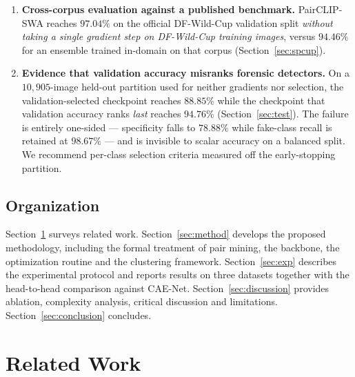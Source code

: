 \documentclass[10pt,journal]{IEEEtran}
\begin{document}
\begin{enumerate}
\item \textbf{Cross-corpus evaluation against a published benchmark.}
PairCLIP-SWA reaches $97.04\%$ on the official DF-Wild-Cup validation split
\emph{without taking a single gradient step on DF-Wild-Cup training images},
versus $94.46\%$ for an ensemble trained in-domain on that corpus
(Section~\ref{sec:spcup}).

\item \textbf{Evidence that validation accuracy misranks forensic
detectors.} On a $10{,}905$-image held-out partition used for neither
gradients nor selection, the validation-selected checkpoint reaches $88.85\%$
while the checkpoint that validation accuracy ranks \emph{last} reaches
$94.76\%$ (Section~\ref{sec:test}). The failure is entirely one-sided ---
specificity falls to $78.88\%$ while fake-class recall is retained at
$98.67\%$ --- and is invisible to scalar accuracy on a balanced split. We
recommend per-class selection criteria measured off the early-stopping
partition.
\end{enumerate}

\subsection{Organization}
Section~\ref{sec:related} surveys related work. Section~\ref{sec:method}
develops the proposed methodology, including the formal treatment of pair
mining, the backbone, the optimization routine and the clustering framework.
Section~\ref{sec:exp} describes the experimental protocol and reports results
on three datasets together with the head-to-head comparison against CAE-Net.
Section~\ref{sec:discussion} provides ablation, complexity analysis, critical
discussion and limitations. Section~\ref{sec:conclusion} concludes.

\section{Related Work}\label{sec:related}
\end{document}
